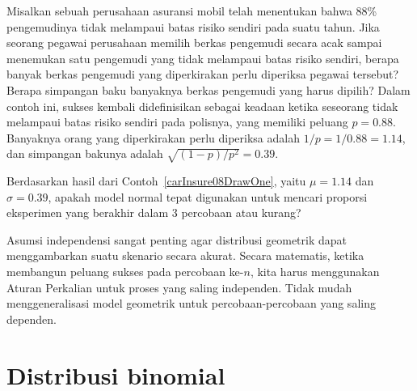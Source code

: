 \D{\newpage}

\begin{examplewrap}
\begin{nexample}{Misalkan sebuah perusahaan asuransi mobil telah
    menentukan bahwa 88\% pengemudinya tidak melampaui batas risiko sendiri
    pada suatu tahun. Jika seorang pegawai perusahaan memilih berkas
    pengemudi secara acak sampai menemukan satu pengemudi yang tidak
    melampaui batas risiko sendiri, berapa banyak berkas pengemudi yang
    diperkirakan perlu diperiksa pegawai tersebut? Berapa simpangan baku
    banyaknya berkas pengemudi yang harus dipilih?}
  \label{carInsure08DrawOne}%
  Dalam contoh ini, sukses kembali didefinisikan sebagai keadaan ketika
  seseorang tidak melampaui batas risiko sendiri pada polisnya, yang memiliki
  peluang $p = 0.88$. Banyaknya orang yang diperkirakan perlu diperiksa
  adalah $1 / p = 1 / 0.88 = 1.14$, dan simpangan bakunya adalah
  $\sqrt{(1-p)/p^2} = 0.39$.
\end{nexample}
\end{examplewrap}

\begin{exercisewrap}
\begin{nexercise}
Berdasarkan hasil dari Contoh~\ref{carInsure08DrawOne}, yaitu
$\mu = 1.14$ dan $\sigma = 0.39$, apakah model normal tepat digunakan
untuk mencari proporsi eksperimen yang berakhir dalam 3 percobaan atau
kurang?\footnotemark{}
\end{nexercise}
\end{exercisewrap}

Asumsi independensi sangat penting agar distribusi geometrik dapat
menggambarkan suatu skenario secara akurat. Secara matematis, ketika
membangun peluang sukses pada percobaan ke-$n$, kita harus menggunakan
Aturan Perkalian untuk proses yang saling independen. Tidak mudah
menggeneralisasi model geometrik untuk percobaan-percobaan yang saling
dependen.



{}
\section{Distribusi binomial}
\label{binomialModel}


